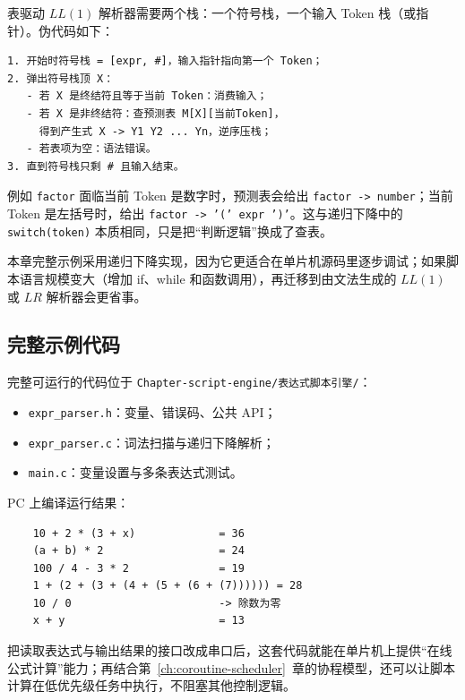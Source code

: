 表驱动 $LL(1)$ 解析器需要两个栈：一个符号栈，一个输入 Token 栈（或指针）。伪代码如下：

\begin{lstlisting}
1. 开始时符号栈 = [expr, #]，输入指针指向第一个 Token；
2. 弹出符号栈顶 X：
   - 若 X 是终结符且等于当前 Token：消费输入；
   - 若 X 是非终结符：查预测表 M[X][当前Token]，
     得到产生式 X -> Y1 Y2 ... Yn，逆序压栈；
   - 若表项为空：语法错误。
3. 直到符号栈只剩 # 且输入结束。
\end{lstlisting}

例如 \texttt{factor} 面临当前 Token 是数字时，预测表会给出 \texttt{factor -> number}；当前 Token 是左括号时，给出 \texttt{factor -> '(' expr ')'}。这与递归下降中的 \texttt{switch(token)} 本质相同，只是把“判断逻辑”换成了查表。

本章完整示例采用递归下降实现，因为它更适合在单片机源码里逐步调试；如果脚本语言规模变大（增加 if、while 和函数调用），再迁移到由文法生成的 $LL(1)$ 或 $LR$ 解析器会更省事。

\subsection{完整示例代码}

完整可运行的代码位于 \texttt{Chapter-script-engine/表达式脚本引擎/}：

\begin{itemize}
	\item \texttt{expr\_parser.h}：变量、错误码、公共 API；
	\item \texttt{expr\_parser.c}：词法扫描与递归下降解析；
	\item \texttt{main.c}：变量设置与多条表达式测试。
\end{itemize}

PC 上编译运行结果：

\begin{lstlisting}
	10 + 2 * (3 + x)             = 36
	(a + b) * 2                  = 24
	100 / 4 - 3 * 2              = 19
	1 + (2 + (3 + (4 + (5 + (6 + (7)))))) = 28
	10 / 0                       -> 除数为零
	x + y                        = 13
\end{lstlisting}

把读取表达式与输出结果的接口改成串口后，这套代码就能在单片机上提供“在线公式计算”能力；再结合第~\ref{ch:coroutine-scheduler}~章的协程模型，还可以让脚本计算在低优先级任务中执行，不阻塞其他控制逻辑。

